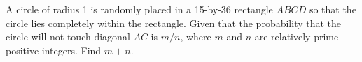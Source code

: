 A circle of radius 1 is randomly placed in a 15-by-36 rectangle $ABCD$ so that the circle lies completely within the rectangle. Given that the probability that the circle will not touch diagonal $AC$ is $m/n$, where $m$ and $n$ are relatively prime positive integers. Find $m + n$.